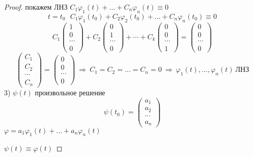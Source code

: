 \begin{proof}
  покажем ЛНЗ $C_1 \varphi_1(t) + \ldots + C_n \varphi_n(t) \equiv 0$
  $$
  t = t_0 ~~~ C_1 \varphi_1(t_0) + C_2 \varphi_2(t_0) + \ldots +
  C_n \varphi_n(t_0) \equiv 0
  $$
  $$
  C_1
  \left(
  \begin{array}{c}
    1 \\
    0 \\
    \cdots \\
    0
  \end{array}
  \right) +
  C_2
  \left(
  \begin{array}{c}
    0 \\
    1 \\
    \cdots \\
    0
  \end{array}
  \right) + \cdots +
  C_k
  \left(
  \begin{array}{c}
    0 \\
    0 \\
    \cdots \\
    1
  \end{array}
  \right) =
  \left(
  \begin{array}{c}
    0 \\
    0 \\
    \cdots \\
    0
  \end{array}
  \right)
  $$
  $$
  \left(
  \begin{array}{c}
    C_1 \\
    C_2 \\
    \cdots \\
    C_n
  \end{array}
  \right) =
  \left(
  \begin{array}{c}
    0 \\
    0 \\
    \cdots \\
    0
  \end{array}
  \right) ~ \Rightarrow ~ C_1 = C_2 = \ldots = C_n = 0 ~ \Rightarrow ~
  \varphi_1(t), \ldots, \varphi_n(t) ~ \text{ЛНЗ}
  $$
  3) $\psi(t)$ произвольное решение
  $$
  \psi(t_0) =
  \left(
  \begin{array}{c}
    a_1 \\
    a_2 \\
    \cdots \\
    a_n
  \end{array}
  \right)
  $$
  $\varphi = a_1 \varphi_1(t) + \ldots + a_n \varphi_n(t)$

  $\psi(t) \equiv \varphi(t)$


\end{proof}
